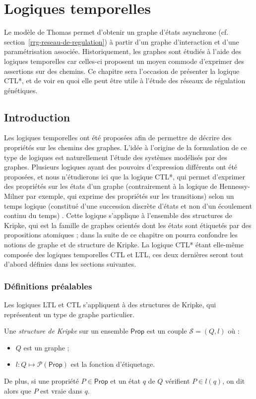 \chapter{Logiques temporelles}
\label{tempo}
Le modèle de Thomas permet d'obtenir un graphe d'états asynchrone (cf. section~\ref{rrg-reseau-de-regulation}) à partir d'un graphe d'interaction et d'une paramétrisation associée. Historiquement, les graphes sont étudiés à l'aide des logiques temporelles car celles-ci proposent un moyen commode \mbox{d'exprimer} des assertions sur des chemins. Ce chapitre sera l'occasion de présenter la logique CTL*, et de voir en quoi elle peut être utile à l'étude des réseaux de régulation génétiques.

\section{Introduction}
Les logiques temporelles ont été proposées afin de permettre de décrire des propriétés sur les chemins des graphes. L'idée à l'origine de la formulation de ce type de logiques est naturellement l'étude des systèmes modélisés par des graphes. Plusieurs logiques ayant des pouvoirs d'expression différents ont été proposées, et nous n'étudierons ici que la logique CTL*, qui permet d'exprimer des propriétés sur les états d'un graphe (contrairement à la logique de Hennessy-Milner par exemple, qui exprime des propriétés sur les transitions) selon un temps logique (constitué d'une succession discrète d'états et non d'un écoulement continu du temps) \cite{arnold-92, berard-08}. Cette logique s'applique à l'ensemble des structures de Kripke, qui est la famille de graphes orientés dont les états sont étiquetés par des propositions atomiques ; dans la suite de ce chapitre on pourra confondre les notions de graphe et de structure de Kripke. La logique CTL* étant elle-même composée des logiques temporelles CTL et LTL, ces deux dernières seront tout d'abord définies dans les sections suivantes.

\subsection*{Définitions préalables}
Les logiques LTL et CTL s'appliquent à des structures de Kripke, qui représentent un type de graphe particulier.
\begin{definition}
Une \emph{structure de Kripke} sur un ensemble $\mathsf{Prop}$ est un couple $\mathcal{S} = (Q, l)$ où :
\begin{itemize}
  \item $Q$ est un graphe ;
  \item $l : Q \mapsto \mathcal{P}(\mathsf{Prop})$ est la fonction d'étiquetage.
\end{itemize}
De plus, si une propriété $P \in \mathsf{Prop}$ et un état $q$ de $Q$ vérifient $P \in l(q)$, on dit alors que $P$ est vraie dans $q$.
\end{definition}

